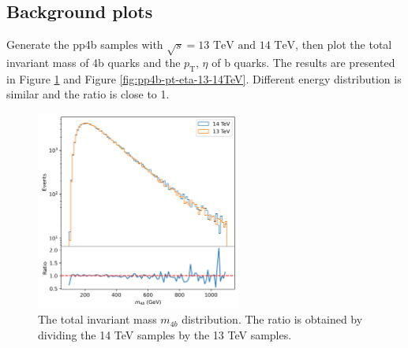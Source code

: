 \documentclass[12pt]{article}
\begin{document}
	\subsection{Background plots}%
	\label{sub:background_plots}
	Generate the pp4b samples with $\sqrt{s} = \text{13 TeV and 14 TeV}$, then plot the total invariant mass of 4b quarks and the $p_{\text{T}}$, $\eta$ of b quarks. The results are presented in Figure \ref{fig:pp4b-m4b-13-14TeV} and Figure \ref{fig:pp4b-pt-eta-13-14TeV}. Different energy distribution is similar and the ratio is close to 1.
		\begin{figure}[htpb]
			\centering
			\includegraphics[width=0.6\textwidth]{pp4b-m4b-13-14TeV.png}
			\caption{The total invariant mass $m_{4b}$ distribution. The ratio is obtained by dividing the 14 TeV samples by the 13 TeV samples.}
			\label{fig:pp4b-m4b-13-14TeV}
		\end{figure}
\end{document}
